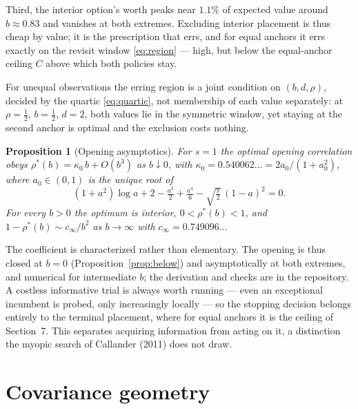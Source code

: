 \documentclass[11pt]{article}
\theoremstyle{itheads}
\newtheorem{proposition}{Proposition}
\begin{document}
Third, the interior option's worth peaks near
$1.1\%$ of expected value around $b\approx 0.83$ and vanishes at both
extremes. Excluding interior placement is thus cheap by value; it is
the prescription that errs, and for equal anchors it errs exactly on
the revisit window \eqref{eq:region} --- high, but below the equal-anchor ceiling
$C$ above which both policies stay.

For unequal observations the erring region is a joint condition on
$\left(b,d,\rho\right)$, decided by the quartic \eqref{eq:quartic}, not membership of each value separately: at
$\rho=\tfrac12$, $b=\tfrac12$, $d=2$, both values lie in the
symmetric window, yet staying at the second anchor is optimal and
the exclusion costs nothing.

\begin{proposition}[Opening asymptotics]\label{prop:openasym}
For $s=1$ the optimal opening correlation obeys
$\rho^{*}(b)=\kappa_0\,b+O(b^{3})$ as $b\downarrow 0$, with
$\kappa_0=0.540062\ldots=2a_0/(1+a_0^{2})$, where $a_0\in(0,1)$ is the
unique root of
\begin{equation}\label{eq:kappa0}
\left(1+a^{2}\right)\log a+2-\tfrac{a^{2}}{2}+\tfrac{a^{4}}{6}
-\sqrt{\tfrac{\pi}{2}}\,\left(1-a\right)^{2}=0 .
\end{equation}
For every $b>0$ the optimum is interior, $0<\rho^{*}(b)<1$, and
$1-\rho^{*}(b)\sim c_{\infty}/b^{2}$ as $b\to\infty$ with
$c_{\infty}=0.749096\ldots$
\end{proposition}

\noindent The coefficient is characterized rather than elementary. The
opening is thus closed at $b=0$ (Proposition~\ref{prop:below}) and
asymptotically at both extremes, and numerical for intermediate $b$;
the derivation and checks are in the repository. A costless informative
trial is always worth running --- even an exceptional incumbent is
probed, only increasingly locally --- so the stopping decision belongs
entirely to the terminal placement, where for equal anchors it is the
ceiling of Section~7. This separates acquiring information from acting on it, a
distinction the myopic search of Callander (2011) does not draw.

\section{Covariance geometry}\label{sec:geometry}
\end{document}
